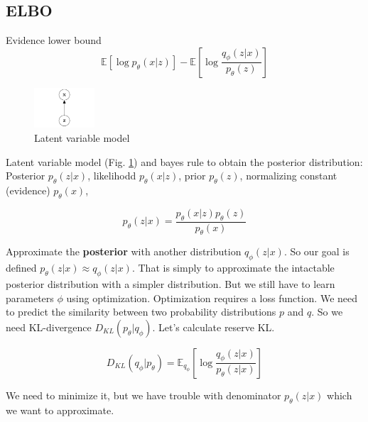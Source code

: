 \subsection{ELBO}
Evidence lower bound
$$\mathbb{E}[\log{p_\theta(x|z)}] - \mathbb{E}[\log{\frac{q_\phi(z|x)}{p_\theta(z)}}]$$

\begin{figure}[h]
    \centering
    \includegraphics[width=0.2\textwidth]{images/latent_variable_mode.png}
    \caption{Latent variable model}
    \label{fig:lanent_variable_model}
\end{figure}

Latent variable model (Fig. \ref{fig:lanent_variable_model}) and bayes rule to obtain the posterior distribution:
Posterior $p_\theta(z|x)$, likelihodd $p_\theta(x|z)$, prior $p_\theta(z)$, normalizing constant (evidence) $p_\theta(x)$,

$$p_\theta(z|x) = \frac{p_\theta(x|z)p_\theta(z)}{p_\theta(x)}$$

Approximate the \textbf{posterior} with another distribution $q_\phi(z|x)$.
So our goal is defined $p_\theta(z|x)\approx q_\phi(z|x)$.
That is simply to approximate the intactable posterior distribution with a simpler distribution.
But we still have to learn parameters $\phi$ using optimization.
Optimization requires a loss function.
We need to predict the similarity between two probability distributions $p$ and $q$.
So we need KL-divergence $D_{KL}(p_\theta|q_\phi)$. Let's calculate reserve KL.

$$D_{KL}(q_\phi|p_\theta) = \mathbb{E}_{q_\phi}[\log{\frac{q_\phi(z|x)}{p_\theta(z|x)}}]$$

We need to minimize it, but we have trouble with denominator $p_\theta(z|x)$ which we want to approximate.

